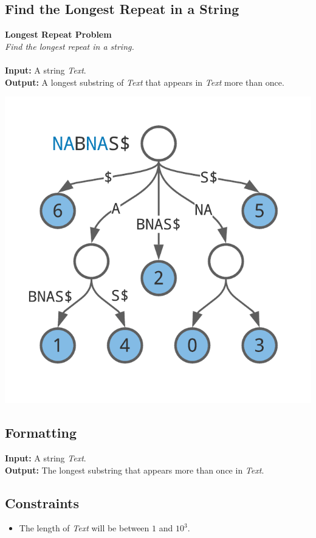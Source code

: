 \documentclass{article}
\begin{document}
\subsection{Find the Longest Repeat in a String}
\hline\vspace{5}
\textbf{Longest Repeat Problem}\\
\emph{Find the longest repeat in a string.}\\ \\
\textbf{Input:} A string \emph{Text}.\\
\textbf{Output:} A longest substring of \emph{Text} that appears in \emph{Text} more than once.
\begin{center}
    \includegraphics[scale=0.2]{c9/logos/9D.png} 
\end{center}
\hline\vspace{5}

\subsection*{Formatting}
\noindent\textbf{Input:} A string \emph{Text}.\\
\noindent\textbf{Output:} The longest substring that appears more than once in \emph{Text}.

\subsection*{Constraints}
\begin{itemize}
    \item The length of \emph{Text} will be between $1$ and $10^3$.
\end{itemize}
\end{document}
